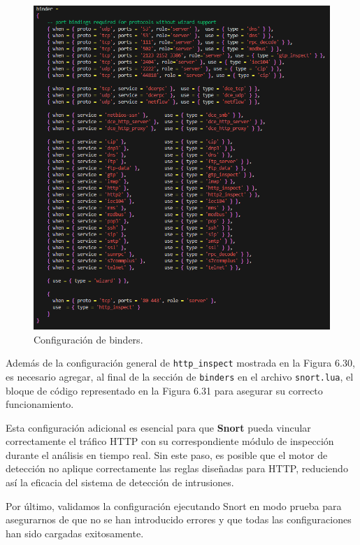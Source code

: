 \documentclass[11pt,a4paper,twoside]{report}
\begin{document}
\begin{figure}[H]
	\centering
	\includegraphics[scale=0.45]{http_inspect/5.png}
	\caption{Configuración de binders.}
\end{figure}



Además de la configuración general de \texttt{http\_inspect} mostrada en la Figura 6.30, es necesario agregar, al final de la sección de \texttt{binders} en el archivo \texttt{snort.lua}, el bloque de código representado en la Figura 6.31 para asegurar su correcto funcionamiento.
\newline

Esta configuración adicional es esencial para que \textbf{Snort} pueda vincular correctamente el tráfico HTTP con su correspondiente módulo de inspección durante el análisis en tiempo real. Sin este paso, es posible que el motor de detección no aplique correctamente las reglas diseñadas para HTTP, reduciendo así la eficacia del sistema de detección de intrusiones.
\newline

Por último, validamos la configuración ejecutando Snort en modo prueba para asegurarnos de que no se han introducido errores y que todas las configuraciones han sido cargadas exitosamente.
\end{document}
